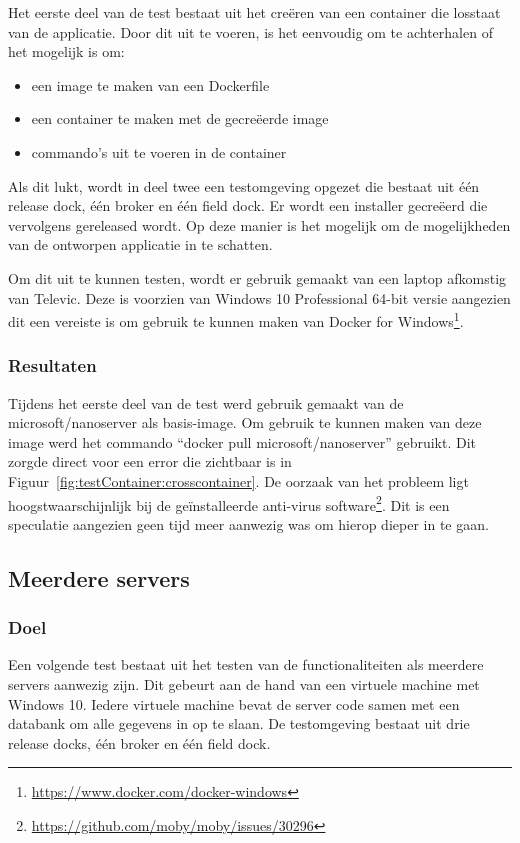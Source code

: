 Het eerste deel van de test bestaat uit het creëren van een container die losstaat van de applicatie.
Door dit uit te voeren, is het eenvoudig om te achterhalen of het mogelijk is om:
\begin{itemize}
\item een image te maken van een Dockerfile
\item een container te maken met de gecreëerde image
\item commando's uit te voeren in de container
\end{itemize}
Als dit lukt, wordt in deel twee een testomgeving opgezet die bestaat uit één release dock, één broker en één field dock.
Er wordt een installer gecreëerd die vervolgens gereleased wordt.
Op deze manier is het mogelijk om de mogelijkheden van de ontworpen applicatie in te schatten.

Om dit uit te kunnen testen, wordt er gebruik gemaakt van een laptop afkomstig van Televic.
Deze is voorzien van Windows 10 Professional 64-bit versie aangezien dit een vereiste is om gebruik te kunnen maken van Docker for Windows\footnote{\url{https://www.docker.com/docker-windows}}.

\subsubsection{Resultaten}
Tijdens het eerste deel van de test werd gebruik gemaakt van de microsoft/nanoserver als basis-image.
Om gebruik te kunnen maken van deze image werd het commando ``docker pull microsoft/nanoserver'' gebruikt.
Dit zorgde direct voor een error die zichtbaar is in Figuur~\ref{fig:testContainer:crosscontainer}.
De oorzaak van het probleem ligt hoogstwaarschijnlijk bij de geïnstalleerde anti-virus software\footnote{\url{https://github.com/moby/moby/issues/30296}}.
Dit is een speculatie aangezien geen tijd meer aanwezig was om hierop dieper in te gaan.

\subsection{Meerdere servers}
\subsubsection{Doel}
Een volgende test bestaat uit het testen van de functionaliteiten als meerdere servers aanwezig zijn.
Dit gebeurt aan de hand van een virtuele machine met Windows 10.
Iedere virtuele machine bevat de server code samen met een databank om alle gegevens in op te slaan.
De testomgeving bestaat uit drie release docks, één broker en één field dock.

